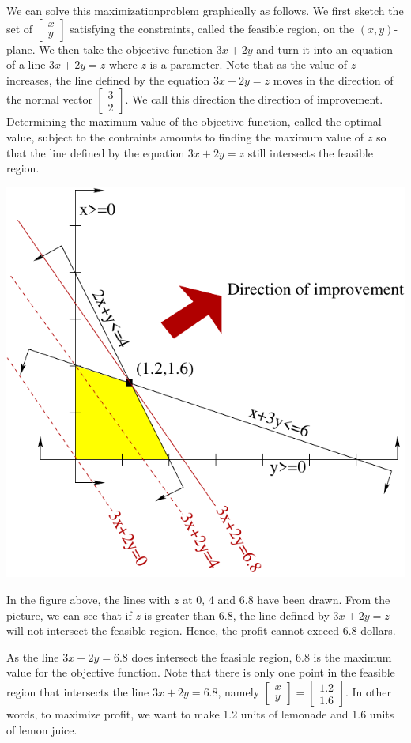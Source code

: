 We can solve this maximizationproblem graphically as follows. We first
sketch the set of \(\begin{bmatrix} x\\ y\end{bmatrix}\) satisfying the
constraints, called the feasible region, on the \((x,y)\)-plane. We then
take the objective function \(3x+2y\) and turn it into an equation of a
line \(3x+2y = z\) where \(z\) is a parameter. Note that as the value of
\(z\) increases, the line defined by the equation \(3x+2y=z\) moves in
the direction of the normal vector
\(\begin{bmatrix} 3 \\ 2\end{bmatrix}\). We call this direction the
direction of improvement. Determining the maximum value of the objective
function, called the optimal value, subject to the contraints amounts to
finding the maximum value of \(z\) so that the line defined by the
equation \(3x+2y=z\) still intersects the feasible region.

\begin{center}\includegraphics[width=0.8\linewidth]{images/lemon} \end{center}

In the figure above, the lines with \(z\) at 0, 4 and 6.8 have been
drawn. From the picture, we can see that if \(z\) is greater than 6.8,
the line defined by \(3x+2y = z\) will not intersect the feasible
region. Hence, the profit cannot exceed 6.8 dollars.

As the line \(3x+2y = 6.8\) does intersect the feasible region, \(6.8\)
is the maximum value for the objective function. Note that there is only
one point in the feasible region that intersects the line \(3x+2y=6.8\),
namely
\(\begin{bmatrix} x \\ y\end{bmatrix} = \begin{bmatrix} 1.2 \\ 1.6\end{bmatrix}.\)
In other words, to maximize profit, we want to make 1.2 units of
lemonade and 1.6 units of lemon juice.


